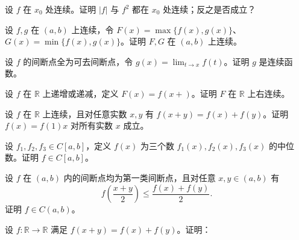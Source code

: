 \newpage
\noindent\begin{minipage}{\textwidth}
设 $f$ 在 $x_0$ 处连续。证明 $|f|$ 与 $f^2$ 都在 $x_0$ 处连续；反之是否成立？
\end{minipage}\par\vfill
\noindent\begin{minipage}{\textwidth}
设 $f,g$ 在 $(a,b)$ 上连续，令 $F(x)=\max\{f(x),g(x)\}$、$G(x)=\min\{f(x),g(x)\}$。证明 $F,G$ 在 $(a,b)$ 上连续。
\end{minipage}\par\vfill
\noindent\begin{minipage}{\textwidth}
设 $f$ 的间断点全为可去间断点，令 $g(x)=\lim_{t\to x}f(t)$。证明 $g$ 是连续函数。
\end{minipage}\par\vfill
\newpage
\noindent\begin{minipage}{\textwidth}
设 $f$ 在 $\mathbb R$ 上递增或递减，定义 $F(x)=f(x+)$。证明 $F$ 在 $\mathbb R$ 上右连续。
\end{minipage}\par\vfill
\noindent\begin{minipage}{\textwidth}
设 $f$ 在 $\mathbb R$ 上连续，且对任意实数 $x,y$ 有 $f(x+y)=f(x)+f(y)$。证明 $f(x)=f(1)x$ 对所有实数 $x$ 成立。
\end{minipage}\par\vfill
\noindent\begin{minipage}{\textwidth}
设 $f_1,f_2,f_3\in C[a,b]$，定义 $f(x)$ 为三个数 $f_1(x),f_2(x),f_3(x)$ 的中位数。证明 $f\in C[a,b]$。
\end{minipage}\par\vfill
\newpage
\noindent\begin{minipage}{\textwidth}
设 $f$ 在 $(a,b)$ 内的间断点均为第一类间断点，且对任意 $x,y\in(a,b)$ 有\[f\left(\frac{x+y}2\right)\le\frac{f(x)+f(y)}2.\]证明 $f\in C(a,b)$。
\end{minipage}\par\vfill
\noindent\begin{minipage}{\textwidth}
设 $f:\mathbb R\to\mathbb R$ 满足 $f(x+y)=f(x)+f(y)$。证明：
\end{minipage}\par\vfill
